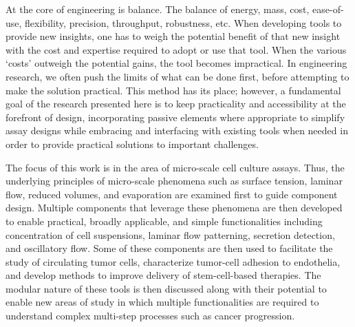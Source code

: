 At the core of engineering is balance. The balance of energy, mass, cost, ease-of-use, flexibility, precision, throughput, robustness, etc. When developing tools to provide new insights, one has to weigh the potential benefit of that new insight with the cost and expertise required to adopt or use that tool. When the various `costs' outweigh the potential gains, the tool becomes impractical. In engineering research, we often push the limits of what can be done first, before attempting to make the solution practical. This method has its place; however, a fundamental goal of the research presented here is to keep practicality and accessibility at the forefront of design, incorporating passive elements where appropriate to simplify assay designs while embracing and interfacing with existing tools when needed in order to provide practical solutions to important challenges.

The focus of this work is in the area of micro-scale cell culture assays. Thus, the underlying principles of micro-scale phenomena such as surface tension, laminar flow, reduced volumes, and evaporation are examined first to guide component design. Multiple components that leverage these phenomena are then developed to enable practical, broadly applicable, and simple functionalities including concentration of cell suspensions, laminar flow patterning, secretion detection, and oscillatory flow. Some of these components are then used to facilitate the study of circulating tumor cells, characterize tumor-cell adhesion to endothelia, and develop methods to improve delivery of stem-cell-based therapies. The modular nature of these tools is then discussed along with their potential to enable new areas of study in which multiple functionalities are required to understand complex multi-step processes such as cancer progression.